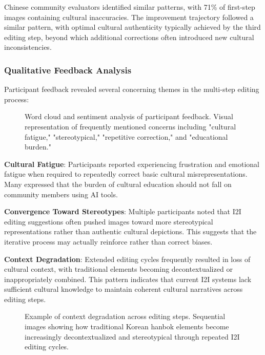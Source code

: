 \documentclass{article}
\begin{document}
Chinese community evaluators identified similar patterns, with 71\% of first-step images containing cultural inaccuracies. The improvement trajectory followed a similar pattern, with optimal cultural authenticity typically achieved by the third editing step, beyond which additional corrections often introduced new cultural inconsistencies.

\subsubsection{Qualitative Feedback Analysis}

Participant feedback revealed several concerning themes in the multi-step editing process:

\begin{figure}[h]
  \centering
  \fbox{\rule[-.5cm]{0cm}{4cm} \rule[-.5cm]{12cm}{0cm}}
  \caption{Word cloud and sentiment analysis of participant feedback. Visual representation of frequently mentioned concerns including "cultural fatigue," "stereotypical," "repetitive correction," and "educational burden."}
  \label{fig:feedback-analysis}
\end{figure}

\textbf{Cultural Fatigue}: Participants reported experiencing frustration and emotional fatigue when required to repeatedly correct basic cultural misrepresentations. Many expressed that the burden of cultural education should not fall on community members using AI tools.

\textbf{Convergence Toward Stereotypes}: Multiple participants noted that I2I editing suggestions often pushed images toward more stereotypical representations rather than authentic cultural depictions. This suggests that the iterative process may actually reinforce rather than correct biases.

\textbf{Context Degradation}: Extended editing cycles frequently resulted in loss of cultural context, with traditional elements becoming decontextualized or inappropriately combined. This pattern indicates that current I2I systems lack sufficient cultural knowledge to maintain coherent cultural narratives across editing steps.

\begin{figure}[h]
  \centering
  \fbox{\rule[-.5cm]{0cm}{6cm} \rule[-.5cm]{12cm}{0cm}}
  \caption{Example of context degradation across editing steps. Sequential images showing how traditional Korean hanbok elements become increasingly decontextualized and stereotypical through repeated I2I editing cycles.}
  \label{fig:context-degradation}
\end{figure}
\end{document}
